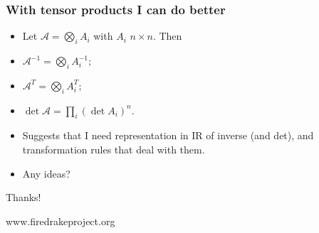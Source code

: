 \documentclass[presentation]{beamer}
\begin{document}
\begin{frame}
  \frametitle{With tensor products I can do better}
  \begin{itemize}
  \item   Let $\mathcal{A} = \bigotimes_i A_i$
    with $A_i$ $n\times n$.  Then
    \item
      $\mathcal{A}^{-1} = \bigotimes_i A_i^{-1};$
    \item
      $\mathcal{A}^T = \bigotimes_i A_i^T;$
    \item
      $\det \mathcal{A} = \prod_i (\det A_i)^n.$
    \item Suggests that I need representation in IR of inverse (and
      det), and transformation rules that deal with them.
    \item Any ideas?
    \end{itemize}
\end{frame}

\begin{frame}[standout]
  Thanks!

  {\small www.firedrakeproject.org}
\end{frame}
\end{document}
